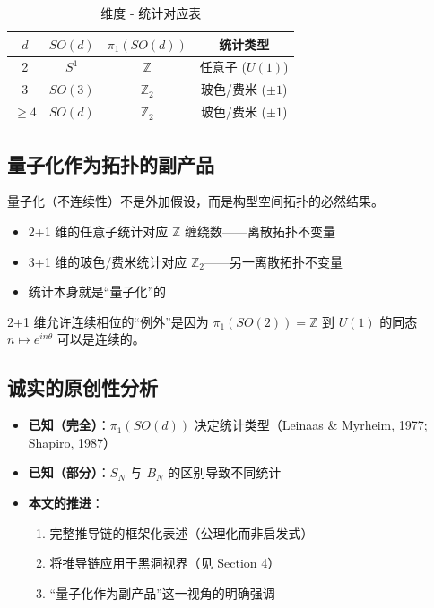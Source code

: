 \documentclass[11pt,a4paper]{article}
\begin{document}
\begin{table}[h]
\centering
\begin{tabular}{c c c c}
\hline
$d$ & $SO(d)$ & $\pi_1(SO(d))$ & 统计类型 \\ \hline
2 & $S^1$ & $\mathbb{Z}$ & 任意子 ($U(1)$) \\
3 & $SO(3)$ & $\mathbb{Z}_2$ & 玻色/费米 ($\pm 1$) \\
$\geq 4$ & $SO(d)$ & $\mathbb{Z}_2$ & 玻色/费米 ($\pm 1$) \\ \hline
\end{tabular}
\caption{维度 - 统计对应表}
\end{table}

\subsection{量子化作为拓扑的副产品}

\begin{corollary}[量子化作为拓扑产物]
量子化（不连续性）不是外加假设，而是构型空间拓扑的必然结果。

\begin{itemize}
\item 2+1 维的任意子统计对应 $\mathbb{Z}$ 缠绕数——离散拓扑不变量
\item 3+1 维的玻色/费米统计对应 $\mathbb{Z}_2$——另一离散拓扑不变量
\item 统计本身就是``量子化''的
\end{itemize}

2+1 维允许连续相位的``例外''是因为 $\pi_1(SO(2)) = \mathbb{Z}$ 到
$U(1)$ 的同态 $n \mapsto e^{in\theta}$ 可以是连续的。
\end{corollary}

\subsection{诚实的原创性分析}

\begin{itemize}
\item \textbf{已知（完全）}：$\pi_1(SO(d))$ 决定统计类型（Leinaas \& Myrheim, 1977; Shapiro, 1987）
\item \textbf{已知（部分）}：$S_N$ 与 $B_N$ 的区别导致不同统计
\item \textbf{本文的推进}：
\begin{enumerate}
\item 完整推导链的框架化表述（公理化而非启发式）
\item 将推导链应用于黑洞视界（见 Section 4）
\item ``量子化作为副产品''这一视角的明确强调
\end{enumerate}
\end{itemize}
\end{document}
